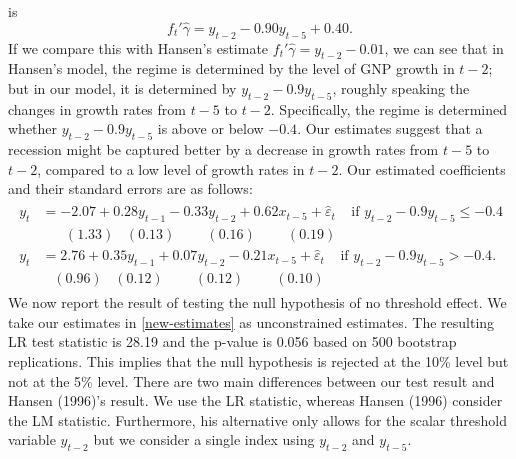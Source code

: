 \documentclass[12pt, reqno]{amsart}
\begin{document}
is 
\[
f_t'\widehat{\gamma} = y_{t-2} - 0.90 y_{t-5}  + 0.40. 
\]
If we compare this with Hansen's estimate $f_t'\widehat{\gamma} =  y_{t-2} - 0.01$, we can see that in Hansen's model, the regime is determined by the level of GNP growth in $t-2$; but in our model, it is determined by $y_{t-2} - 0.9 y_{t-5}$, roughly speaking the changes in growth rates from $t-5$ to $t-2$. Specifically, the regime is determined whether $y_{t-2} - 0.9 y_{t-5}$ is  above or below $- 0.4$.  
Our estimates suggest that a recession might be captured better by a decrease in growth rates from $t-5$ to $t-2$, compared to a low level of growth rates in $t-2$. Our estimated coefficients and their standard errors are as follows:
\begin{align}\label{new-estimates}
\begin{split}
y_t &=  - 2.07 + 0.28 y_{t-1} - 0.33 y_{t-2} + 0.62 x_{t-5} + \widehat{\varepsilon}_t    \;\;\;\; \text{if $y_{t-2} - 0.9 y_{t-5} \leq -0.4$} \\
      &   \;\;\;\;\;\; (1.33) \;\;\; (0.13)   \;\;\;\;\;\;\;\; (0.16)   \;\;\;\;\;\;\;\; (0.19)     \\
y_t &=  2.76 + 0.35 y_{t-1} + 0.07 y_{t-2} - 0.21 x_{t-5} + \widehat{\varepsilon}_t    \;\;\;\; \text{if $y_{t-2} - 0.9 y_{t-5} > -0.4$.}  \\
      &   \;\;\; (0.96) \;\;\; (0.12)   \;\;\;\;\;\;\;\; (0.12)   \;\;\;\;\;\;\;\; (0.10)    
\end{split}
\end{align}
We now report the result of testing the null hypothesis of no threshold effect.  We take our estimates in \eqref{new-estimates} as unconstrained estimates. The resulting LR test statistic is 28.19 and the p-value is 0.056 based on 500 bootstrap replications. This implies that the null hypothesis is rejected at the 10\% level but not at the 5\% level. There are two main differences between our test result and Hansen (1996)'s result. We use the LR statistic, whereas Hansen (1996) consider the LM statistic. Furthermore, his alternative only allows for the scalar threshold variable $y_{t-2}$ but we consider a single index using $y_{t-2}$ and $y_{t-5}$. 
\end{document}
